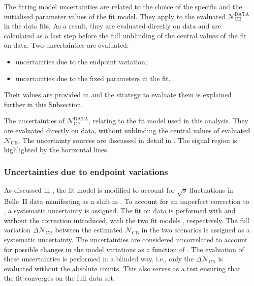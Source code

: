 The \Mbc fitting model uncertainties are related to the choice of the specific  
and the initialised parameter values of the fit model.
They apply to the evaluated $\mathcal{N}^{\mathrm{DATA}}_{\mathrm{CB}}$ in the data fits.
As a result, they are evaluated directly on data and are calculated as a last step
before the full unblinding of the central values of the \Mbc fit on data.
Two uncertainties are evaluated:
\begin{itemize}
    \item uncertainties due to the \Mbc endpoint variation;
    \item uncertainties due to the fixed parameters in the \Mbc fit.
\end{itemize}
Their values are provided in  and the strategy to evaluate them is explained further in this Subsection.

\begin{table}[htbp!]
    \centering
    \caption{\label{tab:fit_uncertainties} 
    The uncertainties of $\mathcal{N}^{\mathrm{DATA}}_{\mathrm{CB}}$, relating to the \Mbc fit model used in this analysis.
    They are evaluated directly on data, without unblinding the central values of evaluated $\mathcal{N}_{\mathrm{CB}}$.
    The uncertainty sources are discussed in detail in .
    The signal region is highlighted by the horizontal lines.
    }
    
\end{table}

\subsubsection{Uncertainties due to \texorpdfstring{\Mbc}{Mbc} endpoint variations}\label{sec:fit_endpoint_systematic}

As discussed in , the fit model is modified to account for $\sqrt{s}$ fluctuations in Belle~II data manifesting as a shift in \Mbc.
To account for an imperfect correction to \MC, a systematic uncertainty is assigned.
The fit on data is performed with and without the \Mbc correction introduced, with the two fit models , respectively.
The full variation $\Delta\mathcal{N}_{\mathrm{CB}}$ between the estimated $\mathcal{N}_{\mathrm{CB}}$ in the two scenarios is assigned as a systematic uncertainty.
The uncertainties are considered uncorrelated to account for possible changes in the model variations as a function of \EB.
The evaluation of these uncertainties is performed in a blinded way, i.e., only the $\Delta\mathcal{N}_{\mathrm{CB}}$ is evaluated without the absolute counts.
This also serves as a test ensuring that the fit converges on the full data set.

